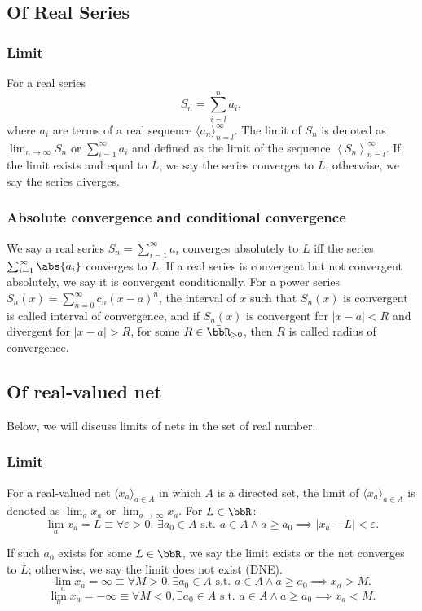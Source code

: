 \subsection{Of Real Series}
\subsubsection{Limit}
For a real series
\[S_n = \sum_{i=l}^n a_i,\]
where \(a_i\) are terms of a real sequence \(\langle a_n\rangle_{n=l}^{\infty}\). The limit of \(S_n\) is denoted as \(\lim_{n\to\infty}S_n\) or \(\sum_{i=1}^{\infty}a_i\) and defined as the limit of the sequence \(\left\langle S_n\right\rangle_{n=l}^{\infty}\). If the limit exists and equal to $L$, we say the series converges to $L$; otherwise, we say the series diverges.
\subsubsection{Absolute convergence and conditional convergence}
We say a real series $S_n=\sum_{i=1}^{\infty}a_i$ converges absolutely to $L$ iff the series $\sum_{i=1}^{\infty}\abs{a_i}$ converges to $L$. If a real series is convergent but not convergent absolutely, we say it is convergent conditionally.
For a power series $S_n(x)=\sum_{n=0}^{\infty}c_n(x-a)^n$, the interval of $x$ such that $S_n(x)$ is convergent is called interval of convergence, and if $S_n(x)$ is convergent for $|x-a|<R$ and divergent for $|x-a|>R$, for some $R\in\bar{\bbR}_{>0}$, then $R$ is called radius of convergence.
\subsection{Of real-valued net}
Below, we will discuss limits of nets in the set of real number.
\subsubsection{Limit}
For a real-valued net $\langle x_a\rangle_{a\in A}$ in which $A$ is a directed set, the limit of $\langle x_a\rangle_{a\in A}$ is denoted as $\lim_a x_a$ or $\lim_{a\to\infty} x_a$. For $L\in\bbR$:
\[\lim_ax_a = L \equiv \forall \varepsilon > 0:\, \exists a_0 \in A\text{\ s.t.\ } a\in A\land a\ge a_0\implies |x_a - L| < \varepsilon.\]

If such $a_0$ exists for some $L\in\bbR$, we say the limit exists or the net converges to $L$; otherwise, we say the limit does not exist (DNE).
\[\lim_{a}x_a=\infty \equiv \forall M > 0, \exists a_0 \in A \text{\ s.t.\ } a\in A\land a\geq a_0 \implies x_a > M.\]
\[\lim_{a}x_a=-\infty \equiv \forall M < 0, \exists a_0 \in A \text{\ s.t.\ } a\in A\land a\geq a_0 \implies x_a < M.\]
